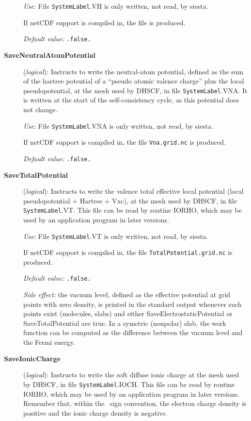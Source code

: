 \begin{description}
\textit{Use:} File \texttt{SystemLabel}.VH is only written, not read, by siesta.

If netCDF support is compiled in, the file  is produced.

\textit{Default value:} \texttt{.false.}

\item[\textbf{SaveNeutralAtomPotential}] (\textit{logical}):
Instructs to write the neutral-atom potential, defined as the
sum of the hartree potential of a ``pseudo atomic valence charge''
plus the local pseudopotential, at the mesh used by DHSCF,
in file \texttt{SystemLabel}.VNA. It is written at the start of the
self-consistency cycle, as this potential does not change.

\textit{Use:} File \texttt{SystemLabel}.VNA is only written, not read, by siesta.

If netCDF support is compiled in, the file \texttt{Vna.grid.nc} is produced.

\textit{Default value:} \texttt{.false.}


\item[\textbf{SaveTotalPotential}] (\textit{logical}):
Instructs to write the valence total effective local potential
(local pseudopotential + Hartree + Vxc), at the
mesh used by DHSCF,
in file \texttt{SystemLabel}.VT. This file can be read by routine IORHO,
which may be used by an application program in later versions.

\textit{Use:} File \texttt{SystemLabel}.VT is only written, not read, by siesta.

If netCDF support is compiled in, the file \texttt{TotalPotential.grid.nc} is produced.

\textit{Default value:} \texttt{.false.}

\textit{Side effect:} the vacuum level, defined as the effective 
potential at grid points with zero density, is printed in the standard 
output whenever such points exist (molecules, slabs) and either 
SaveElectrostaticPotential or SaveTotalPotential are true.
In a symetric (nonpolar) slab, the work function can be computed as 
the difference between the vacuum level and the Fermi energy.


\item[\textbf{SaveIonicCharge}] (\textit{logical}):
Instructs to write the soft diffuse ionic charge at the
mesh used by DHSCF,
in file \texttt{SystemLabel}.IOCH. This file can be read by routine IORHO,
which may be used by an application program in later versions.
Remember that, within the \siesta\ sign convention, the electron charge
density is positive and the ionic charge density is negative.



\end{description}
